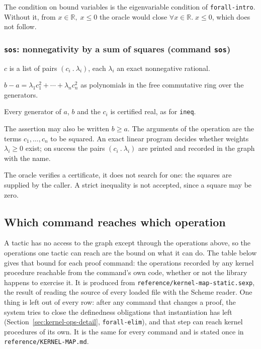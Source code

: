 \begin{remark}
The condition on bound variables is the eigenvariable condition of
\texttt{forall-intro}.  Without it, from $x \in \mathbb{R},\; x \leq 0$
the oracle would close $\forall x \in \mathbb{R}.\; x \leq 0$, which
does not follow.
\end{remark}

\subsubsection*{\texttt{sos}: nonnegativity by a sum of squares
  (command \texttt{sos})}

\label{kop:sos}%
\begin{VNBcond}
\item[Certificate] $c$ is a list of pairs $(c_i\ .\ \lambda_i)$, each
  $\lambda_i$ an exact nonnegative rational.
\item[Identity] $b - a = \lambda_1 c_1^2 + \cdots + \lambda_n c_n^2$ as
  polynomials in the free commutative ring over the generators.
\item[Typing] Every generator of $a$, $b$ and the $c_i$ is certified
  real, as for \texttt{ineq}.
\end{VNBcond}
The assertion may also be written $b \geq a$.  The arguments of the
operation are the terms $c_1, \ldots, c_n$ to be squared.  An exact
linear program decides whether weights $\lambda_i \geq 0$ exist; on
success the pairs $(c_i\ .\ \lambda_i)$ are printed and recorded in the
graph with the name.

The oracle verifies a certificate, it does not search for one: the
squares are supplied by the caller.  A strict inequality is not accepted,
since a square may be zero.

\subsection{Which command reaches which operation}\label{sec:command-uses}

A tactic has no access to the graph except through the operations above,
so the operations one tactic can reach are the bound on what it can do.
The table below gives that bound for each proof command: the operations
recorded by any kernel procedure reachable from the command's own code,
whether or not the library happens to exercise it.  It is produced from
\texttt{reference/kernel-map-static.sexp}, the result of reading the
source of every loaded file with the Scheme reader.  One thing is left
out of every row: after any command that changes a proof, the system tries
to close the definedness obligations that instantiation has left
(Section~\ref{sec:kernel-ops-detail}, \texttt{forall-elim}), and that step
can reach kernel procedures of its own.  It is the same for every
command and is stated once in \texttt{reference/KERNEL-MAP.md}.

